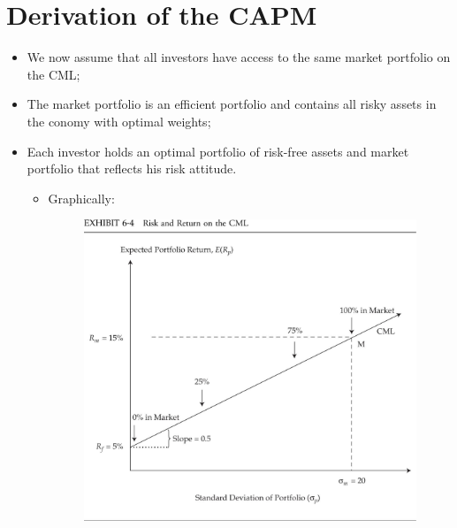 \documentclass[11pt,a4paper]{report}
\begin{document}
\section{Derivation of the CAPM}
\begin{itemize}
    \item We now assume that all investors have access to the same market portfolio on the CML;
    \item The market portfolio is an efficient portfolio and contains all risky assets in the conomy with optimal weights;
    \item Each investor holds an optimal portfolio of risk-free assets and market portfolio that reflects his risk attitude.
    \begin{itemize}
        \item Graphically:
        \begin{figure}[h]
            \centering
            \includegraphics[width=\textwidth]{images/cml risk return.jpg}
        \end{figure}
    \end{itemize}
\end{itemize}
\end{document}
